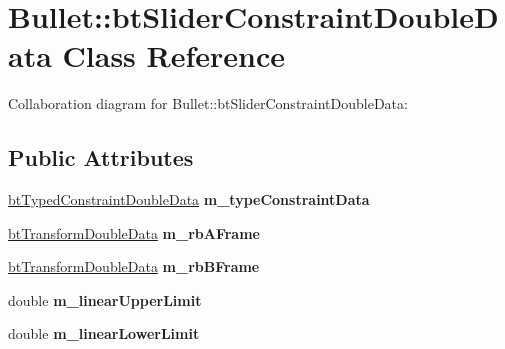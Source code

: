 \hypertarget{class_bullet_1_1bt_slider_constraint_double_data}{\section{Bullet\+:\+:bt\+Slider\+Constraint\+Double\+Data Class Reference}
\label{class_bullet_1_1bt_slider_constraint_double_data}
}


Collaboration diagram for Bullet\+:\+:bt\+Slider\+Constraint\+Double\+Data\+:
\subsection*{Public Attributes}
\begin{DoxyCompactItemize}
\item 
\hypertarget{class_bullet_1_1bt_slider_constraint_double_data_a6812367aae9f7865f773730a18135eb3}{\hyperlink{class_bullet_1_1bt_typed_constraint_double_data}{bt\+Typed\+Constraint\+Double\+Data} {\bfseries m\+\_\+type\+Constraint\+Data}}\label{class_bullet_1_1bt_slider_constraint_double_data_a6812367aae9f7865f773730a18135eb3}

\item 
\hypertarget{class_bullet_1_1bt_slider_constraint_double_data_a73f6c99a8131758e7a733928ebeefe6b}{\hyperlink{class_bullet_1_1bt_transform_double_data}{bt\+Transform\+Double\+Data} {\bfseries m\+\_\+rb\+A\+Frame}}\label{class_bullet_1_1bt_slider_constraint_double_data_a73f6c99a8131758e7a733928ebeefe6b}

\item 
\hypertarget{class_bullet_1_1bt_slider_constraint_double_data_a414adb0379f816f93e0338e601008112}{\hyperlink{class_bullet_1_1bt_transform_double_data}{bt\+Transform\+Double\+Data} {\bfseries m\+\_\+rb\+B\+Frame}}\label{class_bullet_1_1bt_slider_constraint_double_data_a414adb0379f816f93e0338e601008112}

\item 
\hypertarget{class_bullet_1_1bt_slider_constraint_double_data_aebc7505de118e13c9c6524f2d9ac5efb}{double {\bfseries m\+\_\+linear\+Upper\+Limit}}\label{class_bullet_1_1bt_slider_constraint_double_data_aebc7505de118e13c9c6524f2d9ac5efb}

\item 
\hypertarget{class_bullet_1_1bt_slider_constraint_double_data_a261da3d5c2f3d15d0ac55a41e2228bdc}{double {\bfseries m\+\_\+linear\+Lower\+Limit}}\label{class_bullet_1_1bt_slider_constraint_double_data_a261da3d5c2f3d15d0ac55a41e2228bdc}


\end{DoxyCompactItemize}
